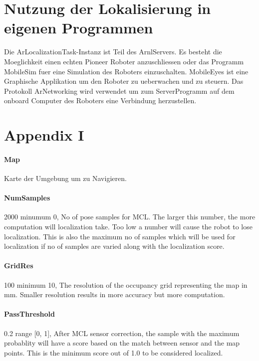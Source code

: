 \documentclass{article}
\begin{document}
\section{Nutzung der Lokalisierung in eigenen Programmen}

Die ArLocalizationTask-Instanz ist Teil des ArnlServers. Es besteht die Moeglichkeit einen echten Pioneer Roboter anzuschliessen oder das Programm MobileSim fuer eine Simulation des Roboters einzuschalten. 
MobileEyes ist eine Graphische Applikation um den Roboter zu ueberwachen und zu steuern. Das Protokoll ArNetworking wird verwendet um zum ServerProgramm auf dem onboard Computer des Roboters eine Verbindung herzustellen.



\newpage


\appendix
\section{Appendix I}

\paragraph{Map}          Karte der Umgebung um zu Navigieren. 

\paragraph{NumSamples} 2000           minumum 0,  No of pose samples for MCL. The larger
                          this number, the more computation will localization
                          take. Too low a number will cause the robot to lose
                          localization. This is also the maximum no of samples
                          which will be used for localization if no of samples
                          are varied along with the localization score.

\paragraph{GridRes} 100               minimum 10,  The resolution of the occupancy grid
                          representing the map in mm. Smaller resolution
                          results in more accuracy but more computation.

\paragraph{PassThreshold} 0.2         range [0, 1],  After MCL sensor correction, the
                          sample with the maximum probablity will have a score
                          based on the match between sensor and the map
                          points. This is the minimum score out of 1.0 to be
                          considered localized.
\end{document}
